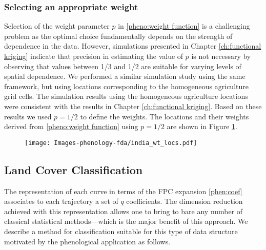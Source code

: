 \subsubsection{Selecting an appropriate weight} 

\label{sub:selecting_an_appropriate_weight} 
Selection of the weight parameter $p$ in \eqref{pheno:weight function} is a challenging problem as the optimal choice fundamentally depends on the strength of dependence in the data. However, simulations presented in Chapter \ref{ch:functional kriging} indicate that precision in estimating the value of $p$ is not necessary by observing that values between 1/3 and 1/2 are suitable for varying levels of spatial dependence. We performed a similar simulation study using the same framework, but using locations corresponding to the homogeneous agriculture grid cells. The simulation results using the homogeneous agriculture locations were consistent with the results in Chapter \ref{ch:functional kriging}. Based on these results we used $p=1/2$ to define the weights. The locations and their weights derived from \eqref{pheno:weight function} using $p=1/2$ are shown in Figure \ref{fig:india weighted locs}. 
\begin{figure}
	[h] \centering 
	\texttt{[image: Images-phenology-fda/india\_wt\_locs.pdf]}  \label{fig:india weighted locs} 
\end{figure}


\subsection{Land Cover Classification} 
\label{sub:land_cover_classification}

The representation of each curve in terms of the FPC expansion \eqref{phen:coef} associates to each trajectory a set of $q$ coefficients. The dimension reduction achieved with this representation allows one to bring to bare any number of classical statistical methods---which is the major benefit of this approach. We describe a method for classification suitable for this type of data structure motivated by the phenological application as follows.


